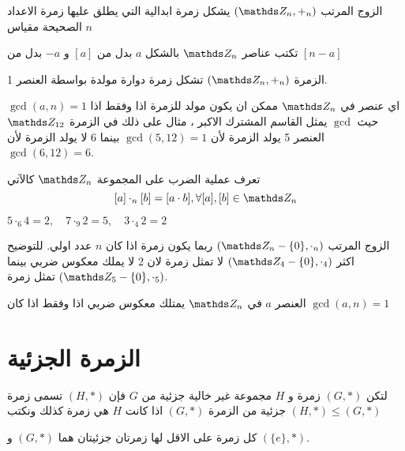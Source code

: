 \begin{theorem}
	الزوج المرتب  $(\Z_n, +_n)$ يشكل زمرة ابدالية التي يطلق عليها زمرة الاعداد الصحيحة مقياس $n$
\end{theorem}

\begin{note}
	تكتب عناصر $\Z_n$ بالشكل $a$ بدل من $[a]$ و $-a$ بدل من $[n-a]$
\end{note}

\begin{theorem}
	الزمرة $(\Z_n, +_n)$ تشكل زمرة دوارة مولدة بواسطة العنصر 1.
\end{theorem}

\begin{note}
	اي عنصر في $\Z_n$ ممكن ان يكون مولد للزمرة اذا وفقط اذا $\gcd(a,n)=1$
	حيث $\gcd$ يمثل القاسم المشترك  الاكبر ، مثال على ذلك في الزمرة $\Z_{12}$ العنصر 5 يولد الزمرة لأن $\gcd(5, 12)=1$ بينما 6 لا يولد الزمرة لأن $\gcd(6,12) = 6 $.
\end{note}
\begin{note}
 تعرف عملية الضرب على المجموعة $\Z_n$ كالآتي 
\[
[a] \cdot_n [b] = [a\cdot b] , \forall [a],[b] \in \Z_n
\]
\end{note}

\begin{example}
	$5\cdot_6 4 =2,\quad 7\cdot_9 2=5,\quad 3\cdot_4 2=2$
\end{example}

\begin{note}
	الزوج المرتب $(\Z_n - \{0\}, \cdot_n)$ ربما يكون زمرة اذا كان $n$ عدد اولي. للتوضيح اكثر $(\Z_4-\{0\}, \cdot_4)$ لا تمثل زمرة لان 2 لا يملك معكوس ضربي بينما $(\Z_5-\{0\},\cdot_5)$ تمثل زمرة.
\end{note}

\begin{note}
	العنصر $a$ في $\Z_n$ يمتلك معكوس ضربي اذا وفقط اذا كان $\gcd(a,n)=1$
\end{note}

\section{الزمرة الجزئية}

\begin{definition}
	لتكن $(G, *)$ زمرة و $H$ مجموعة غير خالية جزئية من $G$ فإن $(H, *)$ تسمى زمرة جزئية من الزمرة $(G, *)$ اذا كانت $H$ هي زمرة كذلك ونكتب $(H, *)\leq (G, *)$
\end{definition}
\begin{example}
	كل زمرة على الاقل لها زمرتان جزئيتان هما $(G, *) $ و $(\{e\}, *)$.
\end{example}

